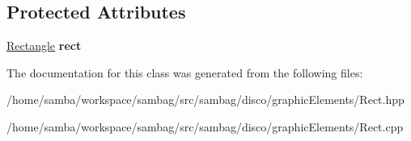 \subsection*{Protected Attributes}
\begin{DoxyCompactItemize}
\item 
\hypertarget{classsambag_1_1disco_1_1graphic_elements_1_1_rect_a676f2829e7383023f03ecec87ef203c2}{
\hyperlink{classsambag_1_1com_1_1_rectangle}{Rectangle} {\bfseries rect}}
\label{classsambag_1_1disco_1_1graphic_elements_1_1_rect_a676f2829e7383023f03ecec87ef203c2}

\end{DoxyCompactItemize}


The documentation for this class was generated from the following files:\begin{DoxyCompactItemize}
\item 
/home/samba/workspace/sambag/src/sambag/disco/graphicElements/Rect.hpp\item 
/home/samba/workspace/sambag/src/sambag/disco/graphicElements/Rect.cpp\end{DoxyCompactItemize}
